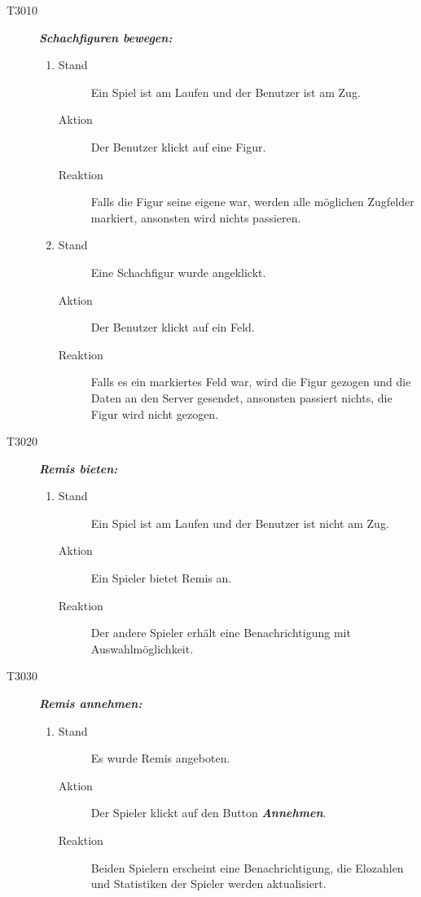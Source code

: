 \documentclass[parskip=full]{scrartcl}
\begin{document}
\begin{description}
	\item[T3010] \textbf{\textit{Schachfiguren bewegen: }} 
	\begin{enumerate}
		\item 
		\begin{description}
			\item[Stand] Ein Spiel ist am Laufen und der Benutzer ist am Zug.
			\item[Aktion] Der Benutzer klickt auf eine  Figur.
			\item[Reaktion] Falls die Figur seine eigene war, werden alle möglichen Zugfelder markiert, ansonsten wird nichts passieren.
		\end{description}
		\item 
		\begin{description}
			\item[Stand] Eine Schachfigur wurde angeklickt.
			\item[Aktion] Der Benutzer klickt auf ein  Feld.
			\item[Reaktion] Falls es ein markiertes Feld war, wird die Figur gezogen und die Daten an den Server gesendet, ansonsten passiert nichts, die Figur wird nicht gezogen.
		\end{description}
	\end{enumerate}
	
	
	\item[T3020] \textbf{\textit{Remis bieten: }} 
	\begin{enumerate}
		\item 
		\begin{description}
			\item[Stand] Ein Spiel ist am Laufen und der Benutzer ist nicht am Zug.
			\item[Aktion] Ein Spieler bietet Remis an.
			\item[Reaktion] Der andere Spieler erhält eine Benachrichtigung mit Auswahlmöglichkeit.
		\end{description}
	\end{enumerate}
	
	\item[T3030] \textbf{\textit{Remis annehmen: }} 
	\begin{enumerate}
		\item 
		\begin{description}
			\item[Stand] Es wurde Remis angeboten. 
			\item[Aktion] Der Spieler klickt auf den Button \textbf{\textit{Annehmen}}. 
			\item[Reaktion] Beiden Spielern erscheint eine Benachrichtigung, die Elozahlen und Statistiken der Spieler werden aktualisiert.
		\end{description}
	\end{enumerate}
	

\end{description}
\end{document}
